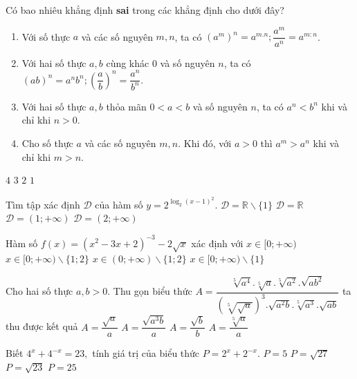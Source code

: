 \begin{ex}%
Có bao nhiêu khẳng định \textbf{sai} trong các khẳng định cho dưới đây?
\begin{enumerate}[(1)]
\item Với số thực $a$ và các số nguyên $m,n$, ta có $(a^m)^n=a^{m.n};\dfrac{a^m}{a^n}=a^{m:n}$.
\item Với hai số thực $a,b$ cùng khác $0$ và số nguyên $n$, ta có $(ab)^n=a^nb^n;\left(\dfrac{a}{b}\right)^n=\dfrac{a^n}{b^n}$.
\item Với hai số thực $a,b$ thỏa mãn $0<a<b$ và số nguyên $n$, ta có $a^n<b^n$ khi và chỉ khi $n>0$.
\item Cho số thực $a$ và các số nguyên $m,n$. Khi đó, với $a>0$ thì $a^m>a^n$ khi và chỉ khi $m>n$.
\end{enumerate}
\choice
{$4$}
{$3$}
{\True $2$}
{$1$}
\end{ex}

\begin{ex}%
Tìm tập xác định $\mathscr{D}$ của hàm số $y=2^{\log_2(x-1)^2}$.
\choice
{\True $\mathscr{D}=\mathbb{R}\backslash\{1\}$}
{$\mathscr{D}=\mathbb{R}$}
{$\mathscr{D}=(1;+\infty)$}
{$\mathscr{D}=(2;+\infty)$}
\end{ex}

\begin{ex}%
Hàm số $f(x)=(x^2-3x+2)^{-3}-2\sqrt{x}$ xác định với
\choice
{$x\in [0;+\infty)$}
{\True $x\in [0;+\infty)\backslash\{1;2\}$}
{$x\in (0;+\infty)\backslash\{1;2\}$}
{$x\in [0;+\infty)\backslash\{1\}$}
\end{ex}

\begin{ex}%
Cho hai số thực $a,b>0$. Thu gọn biểu thức $A=\dfrac{\sqrt[5]{a^4}.\sqrt[5]{a}.\sqrt[5]{a^2}.\sqrt{ab^2}}{\left(\sqrt[5]{\sqrt{a}}\right)^3.\sqrt{a^2b}.\sqrt[5]{a^3}.\sqrt{ab}}$ ta thu được kết quả
\choice
{\True $A=\dfrac{\sqrt{a}}{a}$}
{$A=\dfrac{\sqrt{a^3b}}{a}$}
{$A=\dfrac{\sqrt{b}}{b}$}
{$A=\dfrac{\sqrt[5]{a}}{a}$}
\end{ex}

\begin{ex}%
Biết $4^x+4^{-x}=23,$ tính giá trị của biểu thức $P=2^x+2^{-x}$.
\choice
{\True $P=5$}
{$P=\sqrt{27}$}
{$P=\sqrt{23}$}
{$P=25$}
\end{ex}

